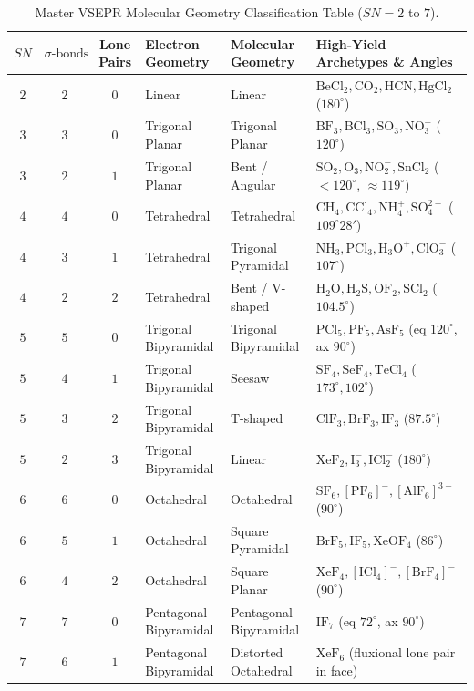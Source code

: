 \documentclass[10pt,a4paper]{article}
\begin{document}
\begin{table}[htbp]
\centering
\small
\renewcommand{\arraystretch}{1.25}
\begin{tabularx}{\textwidth}{c c c p{3.2cm} p{2.8cm} Y}
\toprule
$SN$ & $\sigma\text{-bonds}$ & Lone Pairs & \textbf{Electron Geometry} & \textbf{Molecular Geometry} & \textbf{High-Yield Archetypes \& Angles} \\
\midrule
$2$ & $2$ & $0$ & Linear & Linear & $\mathrm{BeCl_2, CO_2, HCN, HgCl_2}$ ($180^\circ$) \\
\midrule
$3$ & $3$ & $0$ & Trigonal Planar & Trigonal Planar & $\mathrm{BF_3, BCl_3, SO_3, NO_3^-}$ ($120^\circ$) \\
$3$ & $2$ & $1$ & Trigonal Planar & Bent / Angular & $\mathrm{SO_2, O_3, NO_2^-, SnCl_2}$ ($< 120^\circ$, $\approx 119^\circ$) \\
\midrule
$4$ & $4$ & $0$ & Tetrahedral & Tetrahedral & $\mathrm{CH_4, CCl_4, NH_4^+, SO_4^{2-}}$ ($109^\circ 28'$) \\
$4$ & $3$ & $1$ & Tetrahedral & Trigonal Pyramidal & $\mathrm{NH_3, PCl_3, H_3O^+, ClO_3^-}$ ($107^\circ$) \\
$4$ & $2$ & $2$ & Tetrahedral & Bent / V-shaped & $\mathrm{H_2O, H_2S, OF_2, SCl_2}$ ($104.5^\circ$) \\
\midrule
$5$ & $5$ & $0$ & Trigonal Bipyramidal & Trigonal Bipyramidal & $\mathrm{PCl_5, PF_5, AsF_5}$ (eq $120^\circ$, ax $90^\circ$) \\
$5$ & $4$ & $1$ & Trigonal Bipyramidal & Seesaw & $\mathrm{SF_4, SeF_4, TeCl_4}$ ($173^\circ, 102^\circ$) \\
$5$ & $3$ & $2$ & Trigonal Bipyramidal & T-shaped & $\mathrm{ClF_3, BrF_3, IF_3}$ ($87.5^\circ$) \\
$5$ & $2$ & $3$ & Trigonal Bipyramidal & Linear & $\mathrm{XeF_2, I_3^-, ICl_2^-}$ ($180^\circ$) \\
\midrule
$6$ & $6$ & $0$ & Octahedral & Octahedral & $\mathrm{SF_6, [PF_6]^-, [AlF_6]^{3-}}$ ($90^\circ$) \\
$6$ & $5$ & $1$ & Octahedral & Square Pyramidal & $\mathrm{BrF_5, IF_5, XeOF_4}$ ($86^\circ$) \\
$6$ & $4$ & $2$ & Octahedral & Square Planar & $\mathrm{XeF_4, [ICl_4]^-, [BrF_4]^-}$ ($90^\circ$) \\
\midrule
$7$ & $7$ & $0$ & Pentagonal Bipyramidal & Pentagonal Bipyramidal & $\mathrm{IF_7}$ (eq $72^\circ$, ax $90^\circ$) \\
$7$ & $6$ & $1$ & Pentagonal Bipyramidal & Distorted Octahedral & $\mathrm{XeF_6}$ (fluxional lone pair in face) \\
\bottomrule
\end{tabularx}
\caption{Master VSEPR Molecular Geometry Classification Table ($SN = 2$ to $7$).}
\end{table}
\end{document}
